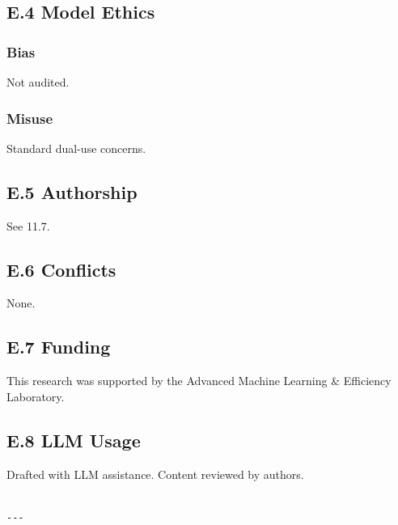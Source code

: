\subsection{E.4 Model Ethics}

\subsubsection{Bias}
Not audited.

\subsubsection{Misuse}
Standard dual-use concerns.

\subsection{E.5 Authorship}

See  11.7.

\subsection{E.6 Conflicts}

None.

\subsection{E.7 Funding}

This research was supported by the Advanced Machine Learning & Efficiency Laboratory.

\subsection{E.8 LLM Usage}

Drafted with LLM assistance. Content reviewed by authors.
\begin{lstlisting}

---
\end{lstlisting}